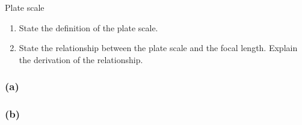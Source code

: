 \documentclass[main.tex]{subfiles}
\begin{document}
\begin{q}{5}
Plate scale
\begin{enumerate}[label=\text{(\alph*)}]
    \item State the definition of the plate scale.
    \item State the relationship between the plate scale and the focal length. Explain the derivation of the relationship.
\end{enumerate}
\end{q}

\begin{sol}
\subsubsection*{(a)}

\subsubsection*{(b)} 
\end{sol}
\end{document}
